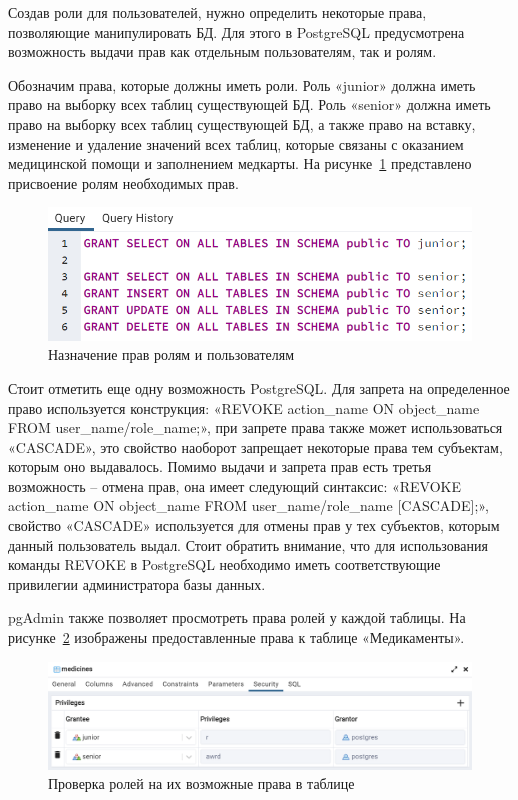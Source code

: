 Создав роли для пользователей, нужно определить некоторые права, позволяющие манипулировать БД. Для этого в PostgreSQL предусмотрена возможность выдачи прав как отдельным пользователям, так и ролям.

Обозначим права, которые должны иметь роли. Роль «junior» должна иметь право на выборку всех таблиц существующей БД. Роль «senior» должна иметь право на выборку всех таблиц существующей БД, а также право на вставку, изменение и удаление значений всех таблиц, которые связаны с оказанием медицинской помощи и заполнением медкарты. На рисунке~\ref{fig:fig13} представлено присвоение ролям необходимых прав.

\begin{figure}
  \includegraphics[scale=0.8]{inc/rights}
  \caption{Назначение прав ролям и пользователям}
  \label{fig:fig13}
\end{figure}

Стоит отметить еще одну возможность PostgreSQL. Для запрета на определенное право используется конструкция: «REVOKE action\_name ON object\_name FROM user\_name/role\_name;», при запрете права также может использоваться «CASCADE», это свойство наоборот запрещает некоторые права тем субъектам, которым оно выдавалось. Помимо выдачи и запрета прав есть третья возможность – отмена прав, она имеет следующий синтаксис: «REVOKE action\_name ON object\_name FROM user\_name/role\_name [CASCADE];», свойство «CASCADE» используется для отмены прав у тех субъектов, которым данный пользователь выдал. Стоит обратить внимание, что для использования команды REVOKE в PostgreSQL необходимо иметь соответствующие привилегии администратора базы данных.

pgAdmin также позволяет просмотреть права ролей у каждой таблицы. На рисунке~\ref{fig:fig14} изображены предоставленные права к таблице «Медикаменты».

\begin{figure}
  \includegraphics[scale=0.46]{inc/rights_tables}
  \caption{Проверка ролей на их возможные права в таблице}
  \label{fig:fig14}
\end{figure}






